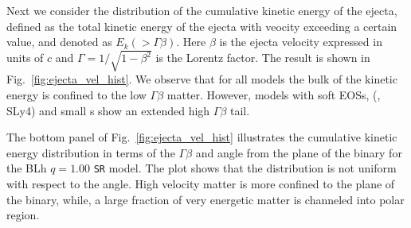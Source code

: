 %
Next we consider the distribution of the cumulative kinetic energy of the ejecta,
defined as the total kinetic energy of the ejecta with veocity exceeding 
a certain value, and denoted as $E_k(>\Gamma\beta)$.
Here $\beta$ is the ejecta velocity expressed in units of $c$ and 
$\Gamma = 1/\sqrt{1-\beta^2}$ is the Lorentz factor.
%
The result is shown in Fig.~\ref{fig:ejecta_vel_hist}. 
%
%
We observe that for all models the bulk of the kinetic energy is confined to 
the low $\Gamma\beta$ matter.
However, models with soft \acp{EOS}, (\eg, SLy4) and small \mr{}s show an
extended high $\Gamma\beta$ tail.

The bottom panel of Fig.~\ref{fig:ejecta_vel_hist} illustrates the 
cumulative kinetic energy distribution in terms of the $\Gamma\beta$ and angle 
from the plane of the binary for the 
BLh $q=1.00$ \texttt{SR} model.
The plot shows that the distribution is not uniform with respect to the angle.
High velocity matter is more confined to the plane of the binary, while,
a large fraction of very energetic matter is channeled into polar region. 






